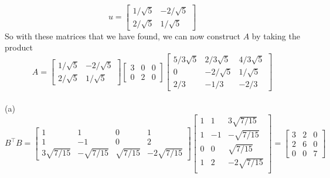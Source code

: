 \documentclass{report}
\begin{document}
$$
u = \begin{bmatrix}
1/\sqrt{5}&-2/\sqrt{5}\\
2/\sqrt{5}&1/\sqrt{5}
\end{bmatrix}
$$
So with these matrices that we have found, we can now construct $A$ by taking the product
$$
A = \begin{bmatrix}
1/\sqrt{5}&-2/\sqrt{5}\\
2/\sqrt{5}&1/\sqrt{5}
\end{bmatrix}
\begin{bmatrix}
3&0&0\\
0&2&0
\end{bmatrix}
\begin{bmatrix}
5/3\sqrt{5}&2/3\sqrt{5}&4/3\sqrt{5}\\
0&-2/\sqrt{5}&1/\sqrt{5}\\
2/3&-1/3&-2/3
\end{bmatrix}
$$
\sol \\
(a)
$$
B^\top B = \begin{bmatrix}
1&1&0&1\\
1&-1&0&2\\
3\sqrt{7/15}&-\sqrt{7/15}&\sqrt{7/15}&-2\sqrt{7/15}
\end{bmatrix}
\begin{bmatrix}
1&1&3\sqrt{7/15}\\
1&-1&-\sqrt{7/15}\\
0&0&\sqrt{7/15}\\
1&2&-2\sqrt{7/15}\\
\end{bmatrix}=\begin{bmatrix}
3&2&0\\
2&6&0\\
0&0&7
\end{bmatrix}
$$
\end{document}
